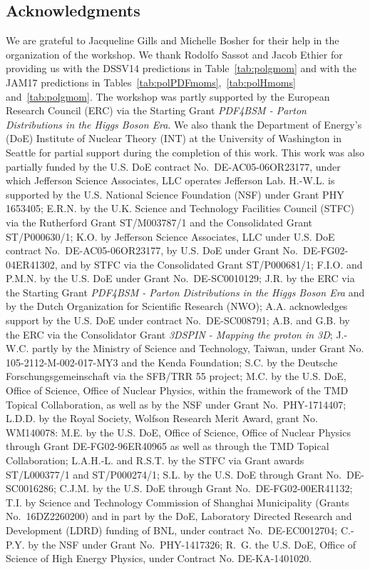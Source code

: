 \subsection*{Acknowledgments}

We are grateful to Jacqueline Gills and Michelle Bosher for their help in the
organization of the workshop.
%
We thank Rodolfo Sassot and Jacob Ethier for providing us with the 
DSSV14 predictions in Table~\ref{tab:polgmom} and with the JAM17 predictions in
Tables~\ref{tab:polPDFmoms},~\ref{tab:polHmoms} and~\ref{tab:polgmom}.
%
The workshop was partly supported by the European Research Council (ERC) via 
the Starting Grant {\it PDF4BSM - Parton Distributions in the Higgs Boson Era}.
%
We also thank the Department of Energy's (DoE) Institute of Nuclear Theory 
(INT) at the University of Washington in Seattle for partial support during 
the completion of this work.
%
This work was also partially funded by the U.S. DoE contract 
No.~DE-AC05-06OR23177, under which Jefferson Science Associates, 
LLC operates Jefferson Lab. 
% 
H.-W.L. is supported by the U.S. National Science Foundation (NSF) under Grant 
PHY 1653405; E.R.N. by the U.K. Science and Technology Facilities Council 
(STFC) via the Rutherford Grant ST/M003787/1 and the Consolidated Grant 
ST/P000630/1; K.O. by Jefferson Science Associates, LLC under U.S. 
DoE contract No.~DE-AC05-06OR23177, 
by U.S. DoE under Grant No.~DE-FG02-04ER41302, 
and by STFC via the Consolidated Grant ST/P000681/1; 
F.I.O. and P.M.N. by the U.S. 
DoE under Grant No.~DE-SC0010129; J.R. by the ERC via the Starting 
Grant {\it PDF4BSM - Parton Distributions in the Higgs Boson Era} and by the 
Dutch Organization for Scientific Research (NWO);
%
A.A. acknowledges support by the U.S. DoE under contract No.~DE-SC008791;
A.B. and G.B. by the ERC via the Consolidator Grant {\it 3DSPIN - Mapping the
proton in 3D};
J.-W.C. partly by the Ministry of Science and Technology, Taiwan,
under Grant No. 105-2112-M-002-017-MY3 and the Kenda Foundation;
S.C. by the Deutsche Forschungsgemeinschaft via the SFB/TRR 55 project;
M.C. by the U.S. DoE, Office of Science, Office of Nuclear Physics, within the 
framework of the TMD Topical Collaboration, as well as by the NSF under Grant 
No.~PHY-1714407;
L.D.D. by the Royal Society, Wolfson Research Merit Award,
grant No. WM140078:
M.E. by the U.S. DoE, Office of Science, Office of Nuclear Physics through 
Grant DE-FG02-96ER40965 as well as through the TMD Topical Collaboration;
L.A.H.-L. and R.S.T. by the STFC via Grant awards ST/L000377/1 and ST/P000274/1;
S.L. by the U.S. DoE through Grant No.~DE-SC0016286;
C.J.M. by the U.S. DoE through Grant No.~DE-FG02-00ER41132;
T.I. by Science and Technology Commission of Shanghai Municipality 
(Grants No.~16DZ2260200) and in part by the DoE, Laboratory Directed Research 
and Development (LDRD) funding of BNL, under contract No.~DE-EC0012704;
C.-P.Y. by the NSF under Grant No.~PHY-1417326;
R.~G.  the U.S. DoE, Office of Science of High Energy Physics,
under Contract No. DE-KA-1401020.



